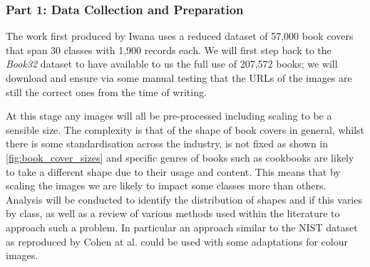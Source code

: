 \documentclass[12pt]{article}
\numberwithin{equation}{section}
\numberwithin{figure}{section}
\begin{document}
\subsubsection{Part 1: Data Collection and Preparation} %
\label{sub:part_0_data_collection_and_preparation}
The work first produced by Iwana\cite{KenjiIwana} uses a reduced dataset of 57,000 book covers that span 30 classes with 1,900 records each. We will first step back to the \emph{Book32} dataset to have available to us the full use of 207,572 books; we will download and ensure via some manual testing that the URLs of the images are still the correct ones from the time of writing.  

At this stage any images will all be pre-processed including scaling to be a sensible size. The complexity is that of the shape of book covers in general, whilst there is some standardisation across the industry, is not fixed as shown in \cref{fig:book_cover_sizes} and specific genres of books such as cookbooks are likely to take a different shape due to their usage and content. This means that by scaling the images we are likely to impact some classes more than others. Analysis will be conducted to identify the distribution of shapes and if this varies by class, as well as a review of various methods used within the literature to approach such a problem. In particular an approach similar to the NIST dataset as reproduced by Cohen at al. \cite{Cohena} could be used with some adaptations for colour images.
\end{document}
